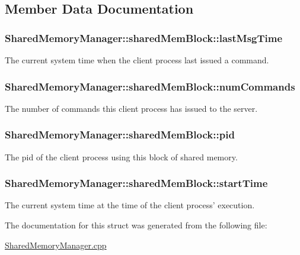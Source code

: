 \subsection{Member Data Documentation}
\hypertarget{structSharedMemoryManager_1_1sharedMemBlock_a83d99997177411ee92117b99b1924ddf}{
\subsubsection[{last\-Msg\-Time}]{\setlength{\rightskip}{0pt plus 5cm}Shared\-Memory\-Manager\-::shared\-Mem\-Block\-::last\-Msg\-Time}}\label{structSharedMemoryManager_1_1sharedMemBlock_a83d99997177411ee92117b99b1924ddf}
The current system time when the client process last issued a command. \hypertarget{structSharedMemoryManager_1_1sharedMemBlock_aa3562377afe5f7cb1294887bd328437f}{
\subsubsection[{num\-Commands}]{\setlength{\rightskip}{0pt plus 5cm}Shared\-Memory\-Manager\-::shared\-Mem\-Block\-::num\-Commands}}\label{structSharedMemoryManager_1_1sharedMemBlock_aa3562377afe5f7cb1294887bd328437f}
The number of commands this client process has issued to the server. \hypertarget{structSharedMemoryManager_1_1sharedMemBlock_af10ab35d9c14b164824710adeb4bb2ef}{
\subsubsection[{pid}]{\setlength{\rightskip}{0pt plus 5cm}Shared\-Memory\-Manager\-::shared\-Mem\-Block\-::pid}}\label{structSharedMemoryManager_1_1sharedMemBlock_af10ab35d9c14b164824710adeb4bb2ef}
The pid of the client process using this block of shared memory. \hypertarget{structSharedMemoryManager_1_1sharedMemBlock_a91e99382dfd3baa0a9e9864f0c9964e1}{
\subsubsection[{start\-Time}]{\setlength{\rightskip}{0pt plus 5cm}Shared\-Memory\-Manager\-::shared\-Mem\-Block\-::start\-Time}}\label{structSharedMemoryManager_1_1sharedMemBlock_a91e99382dfd3baa0a9e9864f0c9964e1}
The current system time at the time of the client process' execution. 

The documentation for this struct was generated from the following file\-:\begin{DoxyCompactItemize}
\item 
\hyperlink{SharedMemoryManager_8cpp}{Shared\-Memory\-Manager.\-cpp}\end{DoxyCompactItemize}
